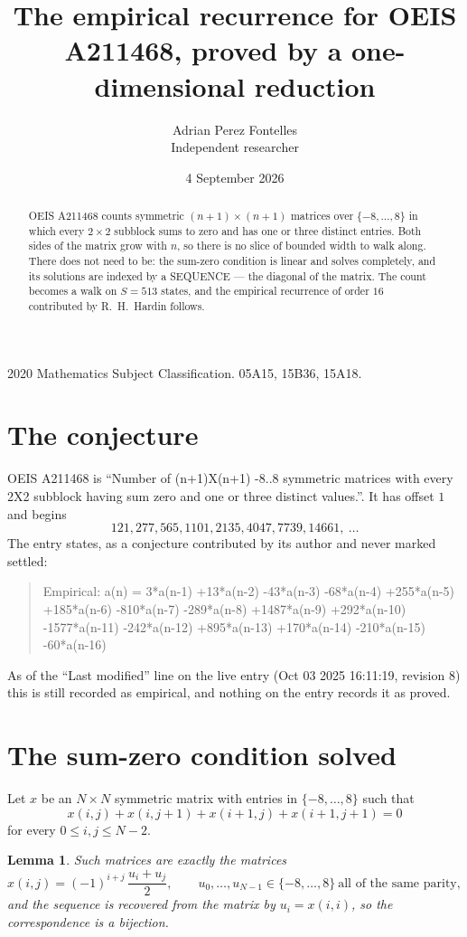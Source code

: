 \documentclass[11pt,a4paper]{article}
\title{The empirical recurrence for OEIS A211468, proved by a one-dimensional reduction}
\author{Adrian Perez Fontelles\\ \small Independent researcher}
\date{4 September 2026}
\theoremstyle{plain}
\newtheorem{lemma}[theorem]{Lemma}
\theoremstyle{definition}
\begin{document}
\maketitle

\begin{abstract}
OEIS A211468 counts symmetric $(n+1)\times(n+1)$ matrices over
$\{-8,\dots,8\}$ in which every $2\times2$ subblock sums to zero and has one or three distinct
entries. Both sides of the matrix grow with $n$, so there is no slice of bounded width to walk
along. There does not need to be: the sum-zero condition is linear and solves completely, and
its solutions are indexed by a SEQUENCE --- the diagonal of the matrix. The count becomes a walk
on $S=513$ states, and the empirical recurrence of order $16$ contributed by R.~H.~Hardin
follows.
\end{abstract}

\noindent\small 2020 Mathematics Subject Classification. 05A15, 15B36, 15A18.\normalsize

\section{The conjecture}

OEIS A211468 is ``Number of (n+1)X(n+1) -8..8 symmetric matrices with every 2X2 subblock having sum zero and one or three distinct values.''. It has offset $1$ and begins
\[
121, 277, 565, 1101, 2135, 4047, 7739, 14661,\ \dots
\]
The entry states, as a conjecture contributed by its author and never marked settled:
\begin{quote}
Empirical: a(n) = 3*a(n-1) +13*a(n-2) -43*a(n-3) -68*a(n-4) +255*a(n-5) +185*a(n-6) -810*a(n-7) -289*a(n-8) +1487*a(n-9) +292*a(n-10) -1577*a(n-11) -242*a(n-12) +895*a(n-13) +170*a(n-14) -210*a(n-15) -60*a(n-16)
\end{quote}
As of the ``Last modified'' line on the live entry (Oct 03 2025 16:11:19, revision 8) this is still
recorded as empirical, and nothing on the entry records it as proved.

\section{The sum-zero condition solved}

Let $x$ be an $N\times N$ symmetric matrix with entries in $\{-8,\dots,8\}$ such that
\[
x(i,j)+x(i,j{+}1)+x(i{+}1,j)+x(i{+}1,j{+}1)=0
\]
for every $0\le i,j\le N-2$.

\begin{lemma}\label{lem:solve}
Such matrices are exactly the matrices
\[
x(i,j)=(-1)^{i+j}\,\frac{u_i+u_j}{2},
\qquad u_0,\dots,u_{N-1}\in\{-8,\dots,8\}\ \text{all of the same parity},
\]
and the sequence is recovered from the matrix by $u_i=x(i,i)$, so the correspondence is a
bijection.
\end{lemma}
\end{document}

